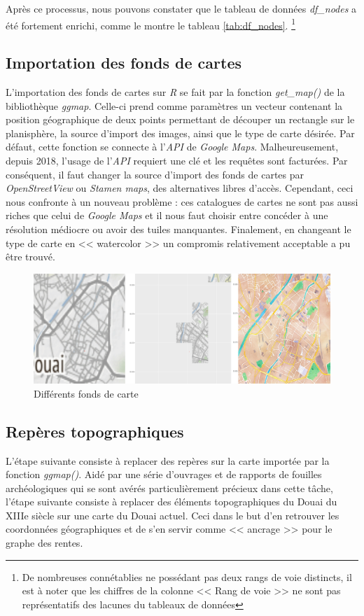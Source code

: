 Après ce processus, nous pouvons constater que le tableau de données \textit{df\_nodes} a été fortement enrichi, comme le montre le tableau \ref{tab:df_nodes}.
\footnote{De nombreuses connétablies ne possédant pas deux rangs de voie distincts, il est à noter que les chiffres de la colonne << Rang de voie >> ne sont pas représentatifs des lacunes du tableaux de données }

\subsection{Importation des fonds de cartes}
L'importation des fonds de cartes sur \textit{R}  se fait par la fonction \textit{get\_map()} de la bibliothèque \textit{ggmap}. 
Celle-ci prend comme paramètres un vecteur contenant la position géographique de deux points permettant de découper un rectangle sur le planisphère, la source d'import des images, ainsi que le type de carte désirée.
Par défaut, cette fonction se connecte à l'\textit{API} de \textit{Google Maps}. Malheureusement, depuis 2018,  l'usage de l'\textit{API} requiert une clé  et les requêtes sont facturées. Par conséquent, il faut changer la source d'import des fonds de cartes par \textit{OpenStreetView} ou \textit{Stamen maps}, des alternatives libres d'accès. Cependant, ceci nous confronte à un nouveau problème : ces  catalogues de cartes ne sont pas aussi riches que celui de \textit{Google Maps} et il nous faut choisir entre concéder à une résolution médiocre ou  avoir des tuiles manquantes. Finalement, en changeant le type de carte en << watercolor  >> un compromis relativement acceptable a pu être trouvé.

\begin{figure}
    \centering
    \includegraphics[scale=0.4]{3.Results/Img/maps.png}
    \caption{Différents fonds de carte}
    \label{fig:maps}
\end{figure}

\subsection{Repères topographiques}
L'étape suivante consiste à replacer des repères sur la carte importée par la fonction \textit{ggmap()}.
Aidé par une série d'ouvrages et de rapports de fouilles archéologiques  qui se sont avérés particulièrement précieux dans cette tâche, l'étape suivante consiste à replacer des éléments topographiques du Douai du XIIIe siècle sur une carte du Douai actuel. Ceci dans le but d'en retrouver les coordonnées géographiques et de s'en servir comme << ancrage  >> pour le graphe des rentes.

